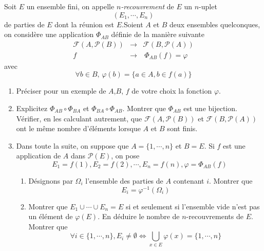 
Soit $E$ un ensemble fini, on appelle \emph{$n$-recouvrement} de
$E$ un $n$-uplet 
$$(E_1, \cdots ,E_n)$$
 de parties de $E$ dont la
r{\'e}union est $E$.\newline Soient $A$ et $B$ deux ensembles
quelconques, on consid{\`e}re une application $\Phi_{AB}$ d{\'e}finie de
la mani{\`e}re suivante
\begin{eqnarray*}
\mathcal{F}(A,\mathcal{P}(B)) & \rightarrow &
\mathcal{F}(B,\mathcal{P}(A))\\
f & \rightarrow & \ \Phi_{AB} (f)= \varphi
\end{eqnarray*}
avec
\[\forall b \in B, \, \varphi(b)=\{a\in A , b\in f(a)\}\]
\begin{enumerate}
  \item Pr{\'e}ciser pour un exemple de $A$,$B$, $f$ de votre choix la
  fonction $\varphi$.
  \item Explicitez $\Phi_{AB}\circ \Phi_{BA}$ et $\Phi_{BA}\circ
  \Phi_{AB}$. Montrer que $\Phi_{AB}$ est une bijection. V{\'e}rifier,
  en les calculant autrement, que $\mathcal{F}(A,\mathcal{P}(B))$
  et $\mathcal{F}(B,\mathcal{P}(A))$ ont le m{\^e}me nombre d'{\'e}l{\'e}ments
  lorsque $A$ et $B$ sont finis.
    \item Dans toute la suite, on suppose que $A=\{1,\cdots , n\}$
    et $B=E$. Si $f$ est une application de $A$ dans
    $\mathcal{P}(E)$, on pose
    \[E_1=f(1),E_2=f(2),\cdots, E_n=f(n), \varphi=\Phi_{AB}(f)\]
     \begin{enumerate}
        \item D{\'e}signons par $\Omega_i$ l'ensemble des parties
        de $A$ contenant $i$. Montrer que
        \[E_i=\varphi^{-1}(\Omega_i)\]
        \item Montrer que $E_1\cup \cdots \cup E_n = E$ si et
        seulement si l'ensemble vide n'est pas un {\'e}l{\'e}ment de
        $\varphi (E)$. En d{\'e}duire le nombre de $n$-recouvrements
        de $E$. Montrer que
        \[\forall i \in \{1, \cdots ,n \} , E_i\neq \emptyset \Leftrightarrow \bigcup _{x\in E} \varphi (x) = \{1,\cdots ,n\} \]
     \end{enumerate}

\end{enumerate}
